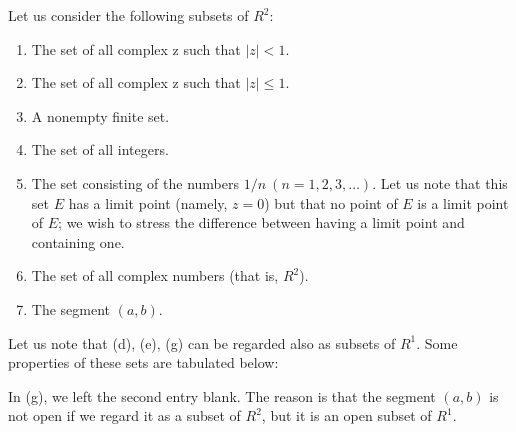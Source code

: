 \documentclass[../poma-notes.tex]{subfiles}
\begin{document}
\begin{examples}
  Let us consider the following subsets of $R^2$:
  \begin{enumerate}[label=(\alph*)]
    \item The set of all complex z such that $|z| < 1$.
    \item The set of all complex z such that $|z| \le 1$.
    \item A nonempty finite set.
    \item The set of all integers.
    \item The set consisting of the numbers $1/n \ (n=1,2,3,\dots)$. Let us note that this set $E$ has a limit point
          (namely, $z=0$) but that no point of $E$ is a limit point of $E$; we wish to stress the difference between having
          a limit point and containing one.
    \item The set of all complex numbers (that is, $R^2$).
    \item The segment $(a,b)$.
  \end{enumerate}

  Let us note that (d), (e), (g) can be regarded also as subsets of $R^1$. Some properties of these sets are tabulated
  below:

  \begin{center}
  \end{center}

  In (g), we left the second entry blank. The reason is that the segment $(a,b)$ is not open if we regard it as a subset
  of $R^2$, but it is an open subset of $R^1$.
\end{examples}
\end{document}
